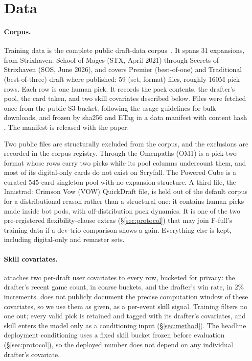 \section{Data}
\label{sec:data}

\paragraph{Corpus.}
Training data is the complete \seventeenlands{} public draft-data
corpus~\citep{seventeenlands}. It spans 31 expansions, from Strixhaven:
School of Mages (STX, April 2021) through Secrets of Strixhaven (SOS, June
2026), and covers Premier (best-of-one) and Traditional (best-of-three)
draft where published: 59 (set, format) files, roughly 160M pick rows.
Each row is one human pick. It records the pack contents, the drafter's
pool, the card taken, and two skill covariates described below. Files were
fetched once from the public S3 bucket, following the \seventeenlands{}
usage guidelines for bulk downloads, and frozen by sha256 and ETag in a
data manifest with content hash \texttt{\DataManifestHash}. The manifest
is released with the paper.

Two public files are structurally excluded from the corpus, and the
exclusions are recorded in the corpus registry. Through the Omenpaths
(OM1) is a pick-two format whose rows carry two picks while its pool
columns undercount them, and most of its digital-only cards do not exist
on Scryfall. The Powered Cube is a curated 545-card singleton pool with no
expansion structure. A third file, the Innistrad: Crimson Vow (VOW)
QuickDraft file, is held out of the default corpus for a distributional
reason rather than a structural one: it contains human picks made inside
bot pods, with off-distribution pack dynamics. It is one of the two
pre-registered flexibility-clause extras (\S\ref{sec:protocol}) that may
join F-full's training data if a dev-trio comparison shows a gain.
Everything else is kept, including digital-only and remaster sets.

\paragraph{Skill covariates.}
\seventeenlands{} attaches two per-draft user covariates to every row,
bucketed for privacy: the drafter's recent game count, in coarse buckets,
and the drafter's win rate, in 2\% increments. \seventeenlands{} does not
publicly document the precise computation window of these covariates, so
we use them as given, as a per-event skill signal. Training filters no one
out; every valid pick is retained and tagged with its drafter's covariates,
and skill enters the model only as a conditioning input
(\S\ref{sec:method}). The headline deployment conditioning uses a fixed
skill bucket frozen before evaluation (\S\ref{sec:protocol}), so the
deployed number does not depend on any individual drafter's covariate.

